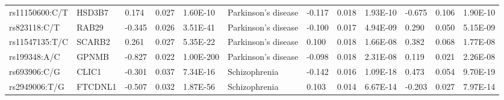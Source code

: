 \begin{table}[]
{\begin{tabular}{llllllllllll}
		\rowcolor[HTML]{E0E0E0}rs11150600:C/T                   & HSD3B7                            & 0.174                             & 0.027                           & 1.60E-10                       & Parkinson’s disease                        & -0.117                            & 0.018                           & 1.93E-10                       & -0.675                          & 0.106                           & 1.90E-10                       \\
		\rowcolor[HTML]{E0E0E0}rs823118:C/T                     & RAB29                             & -0.345                            & 0.026                           & 3.51E-41                       & Parkinson’s disease                        & -0.100                            & 0.017                           & 4.94E-09                       & 0.290                           & 0.050                           & 5.15E-09                       \\
		\rowcolor[HTML]{E0E0E0}rs11547135:T/C                   & SCARB2                            & 0.261                             & 0.027                           & 5.35E-22                       & Parkinson’s disease                        & 0.100                             & 0.018                           & 1.66E-08                       & 0.382                           & 0.068                           & 1.77E-08                       \\
		\rowcolor[HTML]{E0E0E0}rs199348:A/C                     & GPNMB                             & -0.827                            & 0.022                           & 1.00E-200                      & Parkinson’s disease                        & -0.098                            & 0.018                           & 2.31E-08                       & 0.119                           & 0.021                           & 2.26E-08                       \\
		\rowcolor[HTML]{BEBEBE}rs693906:C/G                     & CLIC1                             & -0.301                            & 0.037                           & 7.34E-16                       & Schizophrenia                              & -0.142                            & 0.016                           & 1.09E-18                       & 0.473                           & 0.054                           & 9.70E-19                       \\
		\rowcolor[HTML]{BEBEBE}rs2949006:T/G                    & FTCDNL1                           & -0.507                            & 0.032                           & 1.87E-56                       & Schizophrenia                              & 0.103                             & 0.014                           & 6.67E-14                       & -0.203                          & 0.027                           & 7.97E-14                       \\

\end{tabular}}
\end{table}

